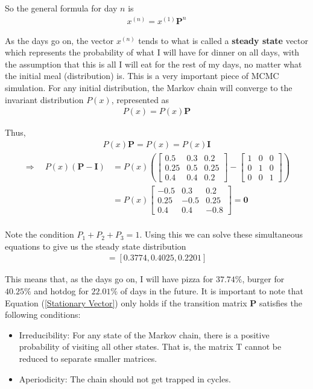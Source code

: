 \documentclass[12pt,twoside]{report}   %
\begin{document}
So the general formula for day $n$ is
\begin{align*}
{x}^{(n)} = {x}^{(1)}\textbf{P}^n
\end{align*}

As the days go on, the vector ${x}^{(n)}$ tends to what is called a \textbf{steady state} vector which represents the probability of what I will have for dinner on all days, with the assumption that this is all I will eat for the rest of my days, no matter what the initial meal (distribution) is. This is a very important piece of MCMC simulation. For any initial distribution, the Markov chain will converge to the invariant distribution $P(x)$, represented as
\begin{align}\label{Stationary Vector}
P(x) = P(x)\textbf{P}
\end{align}

Thus,
\begin{align*}
P(x)\textbf{P} = P(x) = P(x)\textbf{I}
\end{align*}
\vspace{-30pt}
\begin{align*}
\Rightarrow\quad P(x)(\textbf{P} - \textbf{I}) &= P(x)\left(\begin{bmatrix}
    0.5 & 0.3 & 0.2 \\
    0.25 & 0.5 & 0.25 \\
    0.4 & 0.4 & 0.2
\end{bmatrix} - \begin{bmatrix}
    1 & 0 & 0 \\
    0 & 1 & 0 \\
    0 & 0 & 1
\end{bmatrix}\right)\\
&= P(x)\begin{bmatrix}
    -0.5 & 0.3 & 0.2 \\
    0.25 & -0.5 & 0.25 \\
    0.4 & 0.4 & -0.8
\end{bmatrix} = \boldsymbol{0}\\
\end{align*}

Note the condition $P_1 + P_2 + P_3 = 1$. Using this we can solve these simultaneous equations to give us the steady state distribution
\begin{align*}
[P_1,P_2,P_3] = [0.3774,0.4025,0.2201]
\end{align*}

This means that, as the days go on, I will have pizza for $37.74\%$, burger for $40.25\%$ and hotdog for $22.01\%$ of days in the future. It is important to note that Equation (\ref{Stationary Vector}) only holds if the transition matrix \textbf{P} satisfies the following conditions:
\begin{itemize}
\item Irreducibility: For any state of the Markov chain, there is a positive probability of visiting
all other states. That is, the matrix T cannot be reduced to separate smaller matrices.
\item Aperiodicity: The chain should not get trapped in cycles.
\end{itemize}
\end{document}
